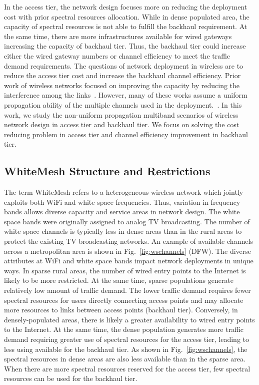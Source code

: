 In the access tier, the network design focuses more on reducing the deployment cost with prior spectral resources allocation.
While in dense populated area, the capacity of spectral resources is not able to fulfill the backhaul requirement. 
At the same time, there are more infrastructures available for wired gateways increasing the capacity of backhaul tier. 
Thus, the backhaul tier could increase either the wired gateway numbers or channel efficiency to meet the traffic demand 
requirements.
The questions of network deployment in wireless
are to reduce the access tier cost and increase the backhaul channel efficiency.
Prior work of wireless networks focused on improving the capacity 
by reducing the interference among the links~\cite{si2010overview,doraghinejad2014channel}. 
However, many of these works assume a uniform propagation ability of the multiple channels used in the deployment.~\cite{doraghinejad2014channel}. 
In this work, we study the non-uniform propagation multiband scenarios of wireless network design in access tier 
and backhaul tier. We focus on solving the cost reducing problem in access tier and channel efficiency 
improvement in backhaul tier.



\subsection{WhiteMesh Structure and Restrictions}
\label{subsec:problem}

The term WhiteMesh refers to a heterogeneous wireless network which jointly exploits 
both WiFi and white space frequencies. Thus, variation in frequency bands allows diverse 
capacity and service areas in network design.
The white space bands were originally assigned to analog TV broadcasting. The 
number of white space channels is typically less in dense areas than in the rural areas to protect the 
existing TV broadcasting networks. An example of available channels across a metropolitan area is shown in Fig.~\ref{fig:wschannels} (DFW). 
The diverse attributes at WiFi and white space bands impact network deployments in unique ways.
In sparse rural areas, the number of wired entry points to the Internet is likely to be more restricted. 
At the same time, sparse populations generate relatively low amount of traffic 
demand. The lower traffic demand requires fewer spectral resources for users directly connecting access points
and may allocate more resources to links between access points (backhaul tier).
Conversely, in densely-populated areas, there is likely a greater availability to wired entry points to the Internet.
At the same time, the dense population generates more traffic demand requiring greater use of spectral resources
for the access tier, leading to less using available for the backhaul tier. 
As shown in Fig.~\ref{fig:wschannels}, the spectral resources in dense areas 
are also less available than in the sparse area. 
When there are more spectral resources reserved 
for the access tier, few spectral resources can be used for the backhaul tier.


